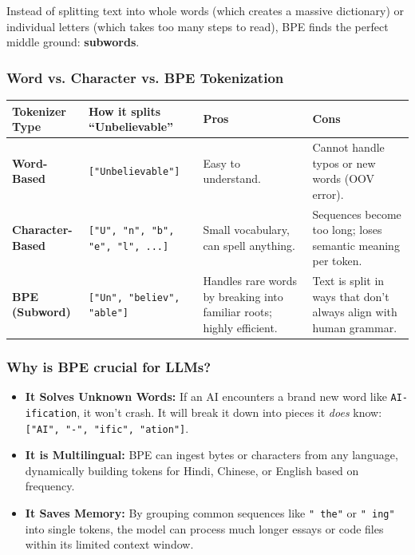 Instead of splitting text into whole words (which creates a massive
dictionary) or individual letters (which takes too many steps to
read), BPE finds the perfect middle ground: \textbf{subwords}.

\subsubsection*{Word vs. Character vs. BPE Tokenization}

\begin{center}
  \renewcommand{\arraystretch}{1.4}
  \begin{tabular}{@{}p{}p{}p{}p{}@{}}
    \textbf{Tokenizer Type} & \textbf{How it splits ``Unbelievable''}
    & \textbf{Pros} & \textbf{Cons} \\
    \hline
    \textbf{Word-Based} & \texttt{["Unbelievable"]} & Easy to
    understand. & Cannot handle typos or new words (OOV error). \\
    \textbf{Character-Based} & \texttt{["U", "n", "b", "e", "l",
    ...]} & Small vocabulary, can spell anything. & Sequences become
    too long; loses semantic meaning per token. \\
    \textbf{BPE (Subword)} & \texttt{["Un", "believ", "able"]} &
    Handles rare words by breaking into familiar roots; highly
    efficient. & Text is split in ways that don't always align with
    human grammar. \\
  \end{tabular}
\end{center}

\subsubsection*{Why is BPE crucial for LLMs?}

\begin{itemize}
    \setlength{\itemsep}{0pt}
  \item \textbf{It Solves Unknown Words:} If an AI encounters a brand
    new word like \texttt{AI-ification}, it won't crash. It will
    break it down into pieces it \textit{does} know: \texttt{["AI",
    "-", "ific", "ation"]}.
  \item \textbf{It is Multilingual:} BPE can ingest bytes or
    characters from any language, dynamically building tokens for
    Hindi, Chinese, or English based on frequency.
  \item \textbf{It Saves Memory:} By grouping common sequences like
    \texttt{" the"} or \texttt{" ing"} into single tokens, the model
    can process much longer essays or code files within its limited
    context window.
\end{itemize}


